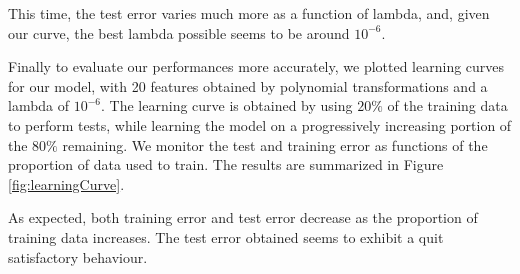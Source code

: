 \documentclass{article} %
\begin{document}
This time, the test error varies much more as a function of lambda, and, given
our curve, the best lambda possible seems to be around $10^{-6}$.

Finally to evaluate our performances more accurately, we plotted learning curves
for our model, with 20 features obtained by polynomial transformations and a
lambda of $10^{-6}$. The learning curve is obtained by using $20\%$ of the
training data to perform tests, while learning the model on a progressively
increasing portion of the $80\%$ remaining. We monitor the test and training
error as functions of the proportion of data used to train. The results are
summarized in Figure \ref{fig:learningCurve}. 

As expected, both training error and test error decrease as the proportion of
training data increases. The test error obtained seems to exhibit a quit
satisfactory behaviour.

\begin{figure}[!h]
\center
{}
\hfill
{}
\caption{}
\end{figure}
\end{document}
